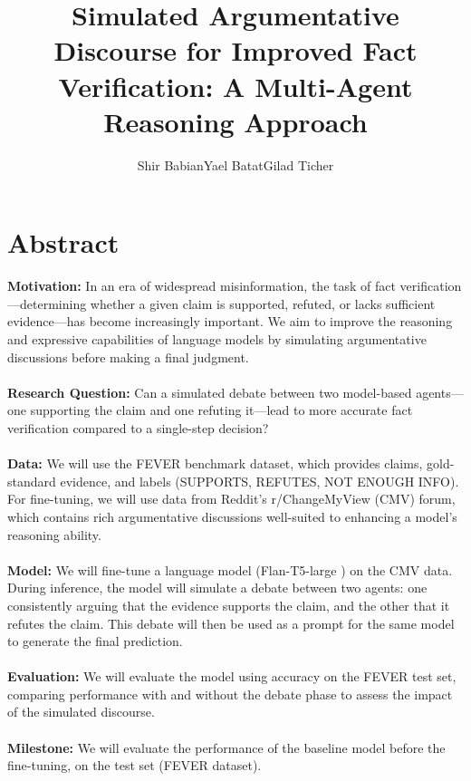 \documentclass[11pt]{article}
\title{Simulated Argumentative Discourse for Improved Fact Verification: A Multi-Agent Reasoning Approach}
\author{
    Shir Babian\qquad Yael Batat\qquad Gilad Ticher
}
\begin{document}
\maketitle
\section{Abstract}
\textbf{Motivation:} In an era of widespread misinformation, the task of fact verification—determining whether a given claim is supported, refuted, or lacks sufficient evidence—has become increasingly important. We aim to improve the reasoning and expressive capabilities of language models by simulating argumentative discussions before making a final judgment.\\\\
\textbf{Research Question:} Can a simulated debate between two model-based agents—one supporting the claim and one refuting it—lead to more accurate fact verification compared to a single-step decision?\\\\
\textbf{Data:} We will use the FEVER \cite{FEVER} benchmark dataset, which provides claims, gold-standard evidence, and labels (SUPPORTS, REFUTES, NOT ENOUGH INFO). For fine-tuning, we will use data from Reddit’s r/ChangeMyView (CMV) \cite{winarg} forum, which contains rich argumentative discussions well-suited to enhancing a model’s reasoning ability.\\\\
\textbf{Model:} We will fine-tune a language model (Flan-T5-large \cite{t5}) on the CMV data. During inference, the model will simulate a debate between two agents: one consistently arguing that the evidence supports the claim, and the other that it refutes the claim. This debate will then be used as a prompt for the same model to generate the final prediction.\\\\
\textbf{Evaluation:} We will evaluate the model using accuracy on the FEVER test set, comparing performance with and without the debate phase to assess the impact of the simulated discourse.\\\\
\textbf{Milestone:} We will evaluate the performance of the baseline model before the fine-tuning, on the test set (FEVER dataset).\\\\




\end{document}
